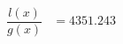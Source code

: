 \documentclass[preview]{standalone}
\begin{document}
\begin{align*}
\dfrac{l(x)}{g(x)} &= 4351.243
\end{align*}
\end{document}
